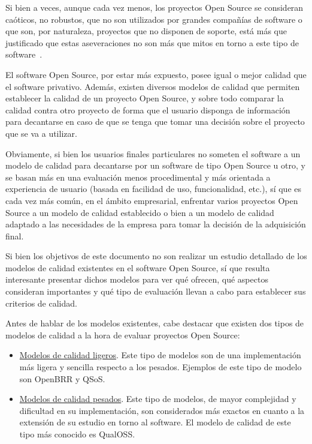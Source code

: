 \documentclass[11pt]{article}
\begin{document}
Si bien a veces, aunque cada vez menos, los proyectos Open Source se consideran caóticos, no robustos, que no son utilizados por grandes compañías de software o que son, por naturaleza, proyectos que no disponen de soporte, está más que justificado que estas aseveraciones no son más que mitos en torno a este tipo de software~\cite{oreilly:tenmythsaboutopensourcesoftware}.

El software Open Source, por estar más expuesto, posee igual o mejor calidad que el software privativo. Además, existen diversos modelos de calidad que permiten establecer la calidad de un proyecto Open Source, y sobre todo comparar la calidad contra otro proyecto de forma que el usuario disponga de información para decantarse en caso de que se tenga que tomar una decisión sobre el proyecto que se va a utilizar.

Obviamente, si bien los usuarios finales particulares no someten el software a un modelo de calidad para decantarse por un software de tipo Open Source u otro, y se basan más en una evaluación menos procedimental y más orientada a experiencia de usuario (basada en facilidad de uso, funcionalidad, etc.), sí que es cada vez más común, en el ámbito empresarial, enfrentar varios proyectos Open Source a un modelo de calidad establecido o bien a un modelo de calidad adaptado a las necesidades de la empresa para tomar la decisión de la adquisición final.

Si bien los objetivos de este documento no son realizar un estudio detallado de los modelos de calidad existentes en el software Open Source, sí que resulta interesante presentar dichos modelos para ver qué ofrecen, qué aspectos consideran importantes y qué tipo de evaluación llevan a cabo para establecer sus criterios de calidad.

Antes de hablar de los modelos existentes, cabe destacar que existen dos tipos de modelos de calidad a la hora de evaluar proyectos Open Source:

\begin{itemize}
\item{\underline{Modelos de calidad ligeros}}. Este tipo de modelos son de una implementación más ligera y sencilla respecto a los pesados. Ejemplos de este tipo de modelo son OpenBRR y QSoS.
\item{\underline{Modelos de calidad pesados}}. Este tipo de modelos, de mayor complejidad y dificultad en su implementación, son considerados más exactos en cuanto a la extensión de su estudio en torno al software. El modelo de calidad de este tipo más conocido es QualOSS.
\end{itemize}
\end{document}
